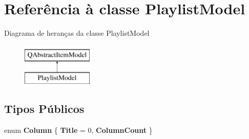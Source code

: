\hypertarget{class_playlist_model}{\section{Referência à classe Playlist\-Model}
\label{class_playlist_model}
}
Diagrama de heranças da classe Playlist\-Model\begin{figure}[H]
\begin{center}
\leavevmode
\includegraphics[height=2.000000cm]{class_playlist_model}
\end{center}
\end{figure}
\subsection*{Tipos Públicos}
\begin{DoxyCompactItemize}
\item 
enum {\bfseries Column} \{ {\bfseries Title} = 0, 
{\bfseries Column\-Count}
 \}
\end{DoxyCompactItemize}
